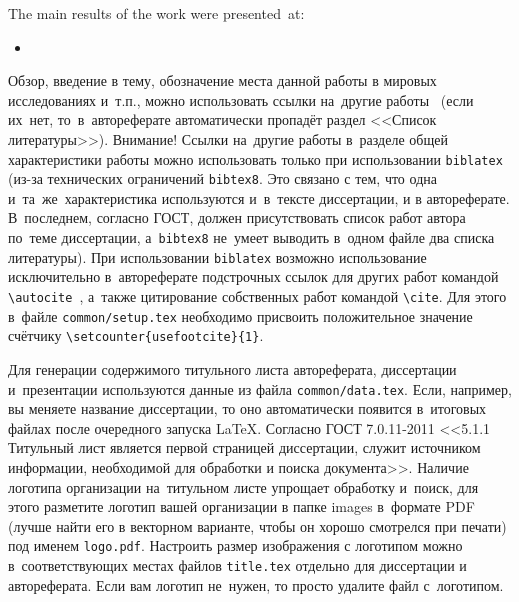 {\probation} The main results of the work were presented~at:
\begin{itemize}
  \item {}
\end{itemize}

{\publications} 
\else
{\actuality} Обзор, введение в тему, обозначение места данной работы в
мировых исследованиях и~т.\:п., можно использовать ссылки на~другие
работы~\autocite{Panov2025}
(если их~нет, то~в~автореферате
автоматически пропадёт раздел <<Список литературы>>). Внимание! Ссылки
на~другие работы в~разделе общей характеристики работы можно
использовать только при использовании \verb!biblatex! (из-за технических
ограничений \verb!bibtex8!. Это связано с тем, что одна
и~та~же~характеристика используются и~в~тексте диссертации, и в
автореферате. В~последнем, согласно ГОСТ, должен присутствовать список
работ автора по~теме диссертации, а~\verb!bibtex8! не~умеет выводить в~одном
файле два списка литературы).
При использовании \verb!biblatex! возможно использование исключительно
в~автореферате подстрочных ссылок
для других работ командой \verb!\autocite!~\autocite{Panov2025}, а~также цитирование
собственных работ командой \verb!\cite!. Для этого в~файле
\verb!common/setup.tex! необходимо присвоить положительное значение
счётчику \verb!\setcounter{usefootcite}{1}!.

Для генерации содержимого титульного листа автореферата, диссертации
и~презентации используются данные из файла \verb!common/data.tex!. Если,
например, вы меняете название диссертации, то оно автоматически
появится в~итоговых файлах после очередного запуска \LaTeX. Согласно
ГОСТ 7.0.11-2011 <<5.1.1 Титульный лист является первой страницей
диссертации, служит источником информации, необходимой для обработки и
поиска документа>>. Наличие логотипа организации на~титульном листе
упрощает обработку и~поиск, для этого разметите логотип вашей
организации в папке images в~формате PDF (лучше найти его в векторном
варианте, чтобы он хорошо смотрелся при печати) под именем
\verb!logo.pdf!. Настроить размер изображения с логотипом можно
в~соответствующих местах файлов \verb!title.tex!  отдельно для
диссертации и автореферата. Если вам логотип не~нужен, то просто
удалите файл с~логотипом.

